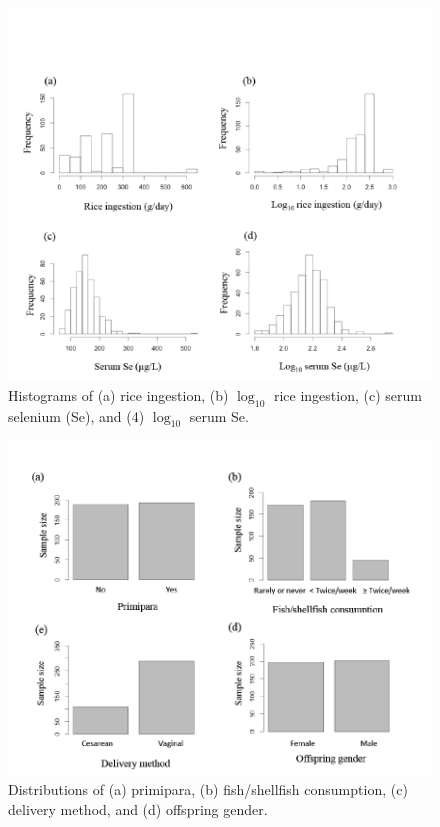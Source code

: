 \begin{figure}
  \centering
  \label{fig:Fig32}
  \includegraphics[scale=1]{Figures/Fig32.pdf}
  \caption[Histograms of (a) rice ingestion, (b) $\log_{10}$ rice ingestion, (c) serum selenium, and (4) $\log_{10}$ serum selenium]{Histograms of (a) rice ingestion, (b) $\log_{10}$ rice ingestion, (c) serum selenium (Se), and (4) $\log_{10}$ serum Se.}
\end{figure}

\begin{figure}
  \centering
    \label{fig:Fig33}
  \includegraphics[scale=1]{Figures/Fig33.pdf}
  \caption[Distributions of (a) primipara, (b) fish/shellfish consumption, (c) delivery method, and (d) offspring gender]{Distributions of (a) primipara, (b) fish/shellfish consumption, (c) delivery method, and (d) offspring gender.}
\end{figure}

